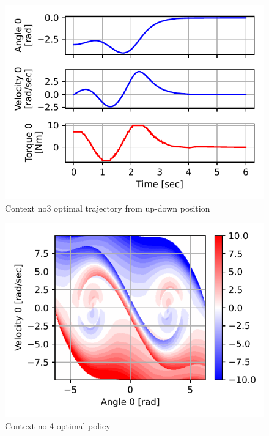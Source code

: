 \begin{figure}[p]
\begin{center}
\includegraphics[width=0.99\linewidth]{fig/c3_traj.pdf}
\caption{Context no3 optimal trajectory from up-down position}\label{fig:c3_traj}
\end{center}
\end{figure}


\begin{figure}[p]
\begin{center}
\includegraphics[width=0.99\linewidth]{fig/c4_policy.pdf}
\caption{Context no 4 optimal policy}\label{fig:c4_policy}
\end{center}
\end{figure}


